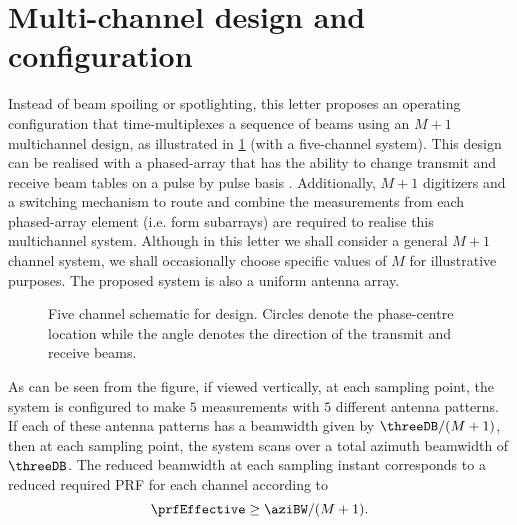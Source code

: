 \section{Multi-channel design and configuration}
Instead of beam spoiling or spotlighting, this letter proposes an operating configuration that time-multiplexes a sequence of beams using an $M+1$ multichannel design, as illustrated in \ref{fg:fivechan} (with a five-channel system). This design can be realised with a phased-array that has the ability to change transmit and receive beam tables on a pulse by pulse basis \cite{CalabreseDiego2014, SikanetaGierullTGRS2015}. Additionally, $M+1$ digitizers and a switching mechanism to route and combine the measurements from each phased-array element (i.e. form subarrays) are required to realise this multichannel system. Although in this letter we shall consider a general $M+1$ channel system, we shall occasionally choose specific values of $M$ for illustrative purposes. The proposed system is also a uniform antenna array.
\begin{figure}[h!]
\begin{center}
 \resizebox{1.0\columnwidth}{!}{}
 \caption{Five channel schematic for design. Circles denote the phase-centre location while the angle denotes the direction of the transmit and receive beams.}
 \label{fg:fivechan}
 \end{center}
\end{figure}
\par
As can be seen from the figure, if viewed vertically, at each sampling point, the system is configured to make $5$ measurements with $5$ different antenna patterns. If each of these antenna patterns has a beamwidth given by $\threeDB/(M+1)$, then at each sampling point, the system scans over a total azimuth beamwidth of $\threeDB$. The reduced beamwidth at each sampling instant corresponds to a reduced required PRF for each channel according to
\begin{equation}
 \prfEffective \geq \aziBW/(M+1).
\end{equation}
